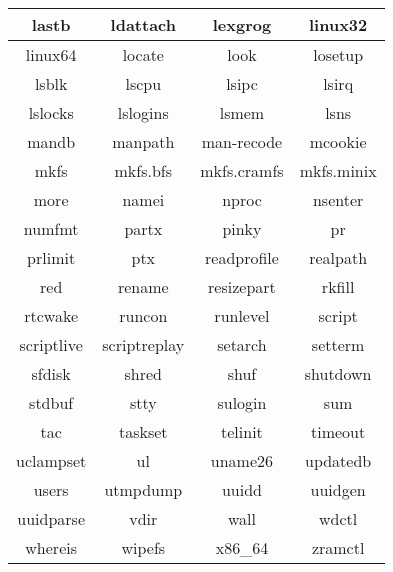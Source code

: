 \begin{center}
    \begin{tabular}{|c|c|c|c|}
        \hline
        lastb & ldattach & lexgrog & linux32 \\
        \hline
        linux64 & locate & look & losetup \\
        \hline
        lsblk & lscpu & lsipc & lsirq \\
        \hline
        lslocks & lslogins & lsmem & lsns \\
        \hline
        mandb & manpath & man-recode & mcookie \\
        \hline
        mkfs & mkfs.bfs & mkfs.cramfs & mkfs.minix \\
        \hline
        more & namei & nproc & nsenter \\
        \hline
        numfmt & partx & pinky & pr \\
        \hline
        prlimit & ptx & readprofile & realpath \\
        \hline
        red & rename & resizepart & rkfill \\
        \hline
        rtcwake & runcon & runlevel & script \\
        \hline
        scriptlive & scriptreplay & setarch & setterm \\
        \hline
        sfdisk & shred & shuf & shutdown \\
        \hline
        stdbuf & stty & sulogin & sum \\
        \hline
        tac & taskset & telinit & timeout \\
        \hline
        uclampset & ul & uname26 & updatedb \\
        \hline
        users & utmpdump & uuidd & uuidgen \\
        \hline
        uuidparse & vdir & wall & wdctl \\
        \hline
        whereis & wipefs & x86\_64 & zramctl \\
        \hline
    \end{tabular}
\end{center}
